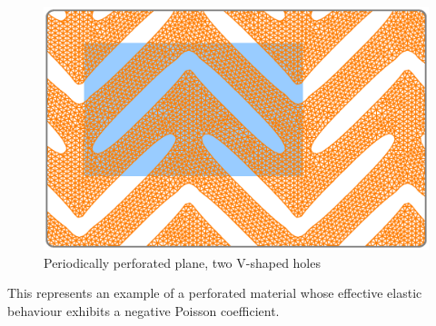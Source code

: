 \begin{figure}[ht] \centering
  \includegraphics[width=140mm]{boomerang-3.eps}
  \caption{Periodically perforated plane, two V-shaped holes}
  \label{\numb section 7.\numb fig 16}
\end{figure}

This represents an example of a perforated material whose effective elastic behaviour
exhibits a negative Poisson coefficient.
